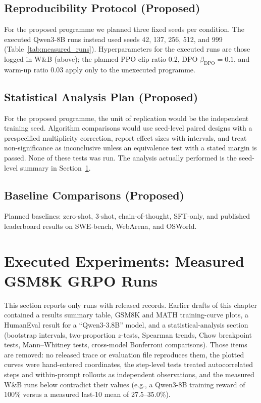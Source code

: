 \documentclass[12pt,a4paper]{report}
\theoremstyle{definition}
\begin{document}
\subsection{Reproducibility Protocol (Proposed)}
For the proposed programme we planned three fixed seeds per condition. The executed Qwen3-8B runs instead used seeds 42, 137, 256, 512, and 999 (Table~\ref{tab:measured_runs}). Hyperparameters for the executed runs are those logged in W\&B (above); the planned PPO clip ratio 0.2, DPO $\beta_{\text{DPO}}=0.1$, and warm-up ratio 0.03 apply only to the unexecuted programme.

\subsection{Statistical Analysis Plan (Proposed)}
For the proposed programme, the unit of replication would be the independent training seed. Algorithm comparisons would use seed-level paired designs with a prespecified multiplicity correction, report effect sizes with intervals, and treat non-significance as inconclusive unless an equivalence test with a stated margin is passed. None of these tests was run. The analysis actually performed is the seed-level summary in Section~\ref{sec:actual_results}.

\subsection{Baseline Comparisons (Proposed)}
Planned baselines: zero-shot, 3-shot, chain-of-thought, SFT-only, and published leaderboard results on SWE-bench, WebArena, and OSWorld.

\section{Executed Experiments: Measured GSM8K GRPO Runs}
\label{sec:actual_results}

This section reports only runs with released records. Earlier drafts of this chapter contained a results summary table, GSM8K and MATH training-curve plots, a HumanEval result for a ``Qwen3-3.8B'' model, and a statistical-analysis section (bootstrap intervals, two-proportion $z$-tests, Spearman trends, Chow breakpoint tests, Mann--Whitney tests, cross-model Bonferroni comparisons). Those items are removed: no released trace or evaluation file reproduces them, the plotted curves were hand-entered coordinates, the step-level tests treated autocorrelated steps and within-prompt rollouts as independent observations, and the measured W\&B runs below contradict their values (e.g., a Qwen3-8B training reward of 100\% versus a measured last-10 mean of 27.5--35.0\%).
\end{document}
